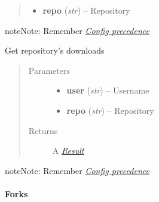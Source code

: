 \documentclass[letterpaper,10pt,english]{sphinxmanual}
\begin{document}
\begin{fulllineitems}
\begin{fulllineitems}
\begin{quote}
\begin{description}
\begin{itemize}
\item {} 
\textbf{repo} (\emph{str}) -- Repository

\end{itemize}

\end{description}\end{quote}

\begin{notice}{note}{Note:}
Remember {\hyperref[repos:config-precedence]{\emph{Config precedence}}}
\end{notice}

\end{fulllineitems}


\begin{fulllineitems}
\label{repos:pygithub3.services.repos.Downloads.list}
Get repository's downloads
\begin{quote}\begin{description}
\item[{Parameters}] \leavevmode\begin{itemize}
\item {} 
\textbf{user} (\emph{str}) -- Username

\item {} 
\textbf{repo} (\emph{str}) -- Repository

\end{itemize}

\item[{Returns}] \leavevmode
A {\hyperref[result::doc]{\emph{Result}}}

\end{description}\end{quote}

\begin{notice}{note}{Note:}
Remember {\hyperref[repos:config-precedence]{\emph{Config precedence}}}
\end{notice}

\end{fulllineitems}


\end{fulllineitems}



\paragraph{Forks}
\label{repos:forks}\label{repos:forks-service}
\end{document}
